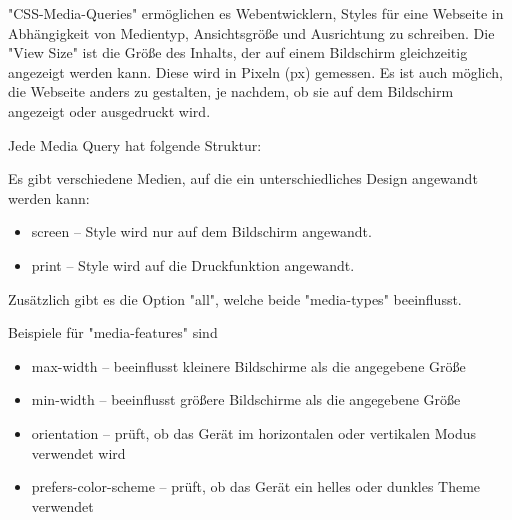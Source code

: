 \label{sec:mediaQueries}

"CSS-Media-Queries" ermöglichen es Webentwicklern, Styles für eine Webseite in Abhängigkeit von Medientyp, Ansichtsgröße und Ausrichtung zu schreiben. 
Die "View Size" ist die Größe des Inhalts, der auf einem Bildschirm gleichzeitig angezeigt werden kann.
Diese wird in Pixeln ({\ttfamily px}) gemessen. 
Es ist auch möglich, die Webseite anders zu gestalten, je nachdem, ob sie auf dem Bildschirm angezeigt oder ausgedruckt wird. 

\begin{minipage}{\textwidth}
    Jede Media Query hat folgende Struktur:
    
\end{minipage}

Es gibt verschiedene Medien, auf die ein unterschiedliches Design angewandt werden kann: 
\begin{itemize}
    \item screen -- Style wird nur auf dem Bildschirm angewandt.
    \item print -- Style wird auf die Druckfunktion angewandt.
\end{itemize}

Zusätzlich gibt es die Option "all", welche beide "media-types" beeinflusst. \cite{w3MediaQueries}

Beispiele für "media-features" sind

\begin{itemize}
    \item max-width -- beeinflusst kleinere Bildschirme als die angegebene Größe
    \item min-width -- beeinflusst größere Bildschirme als die angegebene Größe 
    \item orientation -- prüft, ob das Gerät im horizontalen oder vertikalen Modus verwendet wird
    \item prefers-color-scheme -- prüft, ob das Gerät ein helles oder dunkles Theme verwendet
\end{itemize}
